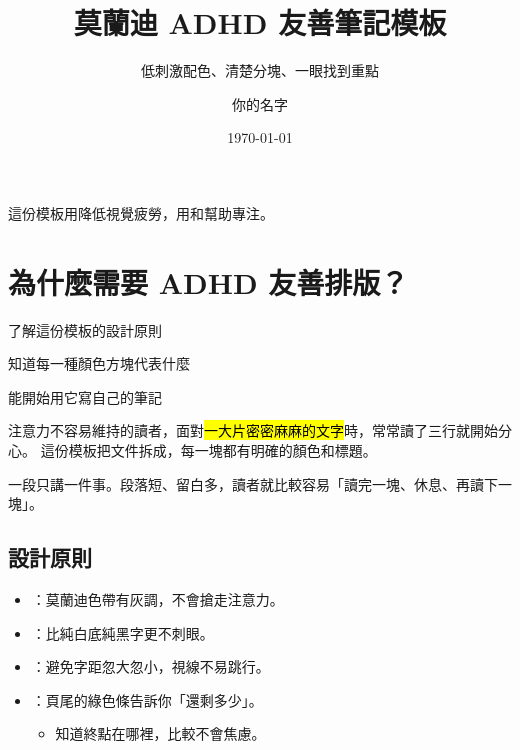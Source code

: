\documentclass{morandi-adhd}
\title{莫蘭迪 ADHD 友善筆記模板}
\subtitle{低刺激配色、清楚分塊、一眼找到重點}
\author{你的名字}
\date{\today}
\begin{document}
\maketitle

\begin{tldr}
  這份模板用降低視覺疲勞，用和幫助專注。
\end{tldr}

\tableofcontents

\section{為什麼需要 ADHD 友善排版？}

\begin{goals}
  \begin{checklist}
    \item 了解這份模板的設計原則
    \item 知道每一種顏色方塊代表什麼
    \item 能開始用它寫自己的筆記
  \end{checklist}
\end{goals}

注意力不容易維持的讀者，面對\hl{一大片密密麻麻的文字}時，常常讀了三行就開始分心。
這份模板把文件拆成，每一塊都有明確的顏色和標題。

\begin{keypoint}
  一段只講一件事。段落短、留白多，讀者就比較容易「讀完一塊、休息、再讀下一塊」。
\end{keypoint}

\subsection{設計原則}

\begin{itemize}
  \item {}：莫蘭迪色帶有灰調，不會搶走注意力。
  \item {}：比純白底純黑字更不刺眼。
  \item {}：避免字距忽大忽小，視線不易跳行。
  \item {}：頁尾的綠色條告訴你「還剩多少」。
    \begin{itemize}
      \item 知道終點在哪裡，比較不會焦慮。
    \end{itemize}
\end{itemize}
\end{document}
